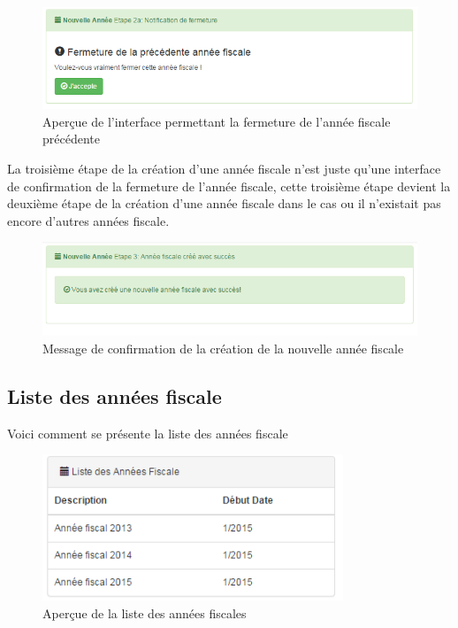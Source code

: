 \documentclass[12pt,a4paper]{report}
\begin{document}
\begin{figure}[h]
\begin{center}
\includegraphics[width=12cm]{pic/CloseFiscYear.png}
\end{center}
\caption{Aperçue de l'interface permettant la fermeture de l'année fiscale précédente}
\label{Aperçue de l'interface permettant la fermeture de l'année fiscale précédente}
\end{figure}

La troisième étape de la création d'une année fiscale n'est juste qu'une interface de confirmation de la fermeture de l'année fiscale, cette troisième étape devient la deuxième étape de la création d'une année fiscale dans le cas ou il n'existait pas encore d'autres années fiscale.

\begin{figure}[h]
\begin{center}
\includegraphics[width=12cm]{pic/ConfirSucces.png}
\end{center}
\caption{Message de confirmation de la création de la nouvelle année fiscale}
\label{Message de confirmation de la création de la nouvelle année fiscale}
\end{figure}

\newpage

\subsection{Liste des années fiscale}
Voici comment se présente la liste des années fiscale

\begin{figure}[h]
\begin{center}
\includegraphics[width=9cm]{pic/ListeAnnFisc.png}
\end{center}
\caption{Aperçue de la liste des années fiscales}
\label{Aperçue de la liste des années fiscaux}
\end{figure}
\end{document}
